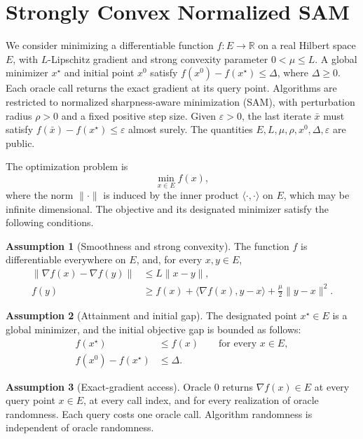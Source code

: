 \documentclass[10pt]{article}
\theoremstyle{definition}
\newtheorem{assumption}{Assumption}
\begin{document}
\section*{Strongly Convex Normalized SAM}
We consider minimizing a differentiable function $f:E\to\mathbb{R}$ on a real Hilbert space $E$, with $L$-Lipschitz gradient and strong convexity parameter $0<\mu\leq L$. A global minimizer $x^\star$ and initial point $x^0$ satisfy $f(x^0)-f(x^\star)\leq\Delta$, where $\Delta\geq0$. Each oracle call returns the exact gradient at its query point. Algorithms are restricted to normalized sharpness-aware minimization (SAM), with perturbation radius $\rho>0$ and a fixed positive step size. Given $\varepsilon>0$, the last iterate $\bar{x}$ must satisfy $f(\bar{x})-f(x^\star)\leq\varepsilon$ almost surely. The quantities $E,L,\mu,\rho,x^0,\Delta,\varepsilon$ are public.

The optimization problem is
\[
\min_{x\in E} f(x),
\]
where the norm $\|\cdot\|$ is induced by the inner product $\langle\cdot,\cdot\rangle$ on $E$, which may be infinite dimensional. The objective and its designated minimizer satisfy the following conditions.

\begin{assumption}[Smoothness and strong convexity]
The function $f$ is differentiable everywhere on $E$, and, for every $x,y\in E$,
\[
\begin{aligned}
\|\nabla f(x)-\nabla f(y)\| &\leq L\|x-y\|,\\
f(y) &\geq f(x)+\langle\nabla f(x),y-x\rangle
       +\frac{\mu}{2}\|y-x\|^2.
\end{aligned}
\]
\end{assumption}

\begin{assumption}[Attainment and initial gap]
The designated point $x^\star\in E$ is a global minimizer, and the initial objective gap is bounded as follows:
\[
\begin{aligned}
f(x^\star) &\leq f(x) \qquad\text{for every }x\in E,\\
f(x^0)-f(x^\star) &\leq\Delta.
\end{aligned}
\]
\end{assumption}

\begin{assumption}[Exact-gradient access]
Oracle $0$ returns $\nabla f(x)\in E$ at every query point $x\in E$, at every call index, and for every realization of oracle randomness. Each query costs one oracle call. Algorithm randomness is independent of oracle randomness.
\end{assumption}
\end{document}
